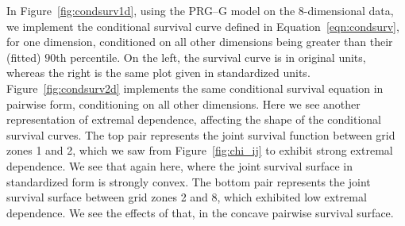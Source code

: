 In Figure~\ref{fig:condsurv1d}, using the PRG--G model on the 8-dimensional data, we implement 
    the conditional survival curve defined in Equation~\ref{eqn:condsurv}, for one dimension, 
    conditioned on all other dimensions being greater than their (fitted) $90$th percentile.  
    On the left, the survival curve is in original units, whereas the right is the same plot 
    given in standardized units.  
    Figure~\ref{fig:condsurv2d} implements the same conditional survival equation in pairwise form,
    conditioning on all other dimensions.  Here we see another representation of extremal dependence,
    affecting the shape of the conditional survival curves.  The top pair represents the joint survival function between grid zones 1 and 2, which we saw from Figure~\ref{fig:chi_ij} to exhibit strong
    extremal dependence.  We see that again here, where the joint survival surface in standardized form
    is strongly convex.  The bottom pair represents the joint survival surface between grid zones 2 and 8, which exhibited low extremal dependence.  We see the effects of that, in the concave pairwise survival surface.
